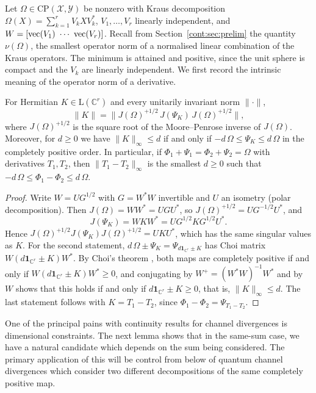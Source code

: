 Let $\Omega\in\mathrm{CP}(\mathcal{X},\mathcal{Y})$ be nonzero with Kraus decomposition $\Omega(X)=\sum_{k=1}^rV_kXV_k^*$, $V_1,\dots,V_r$ linearly independent, and $W=[\vectorise(V_1)\ \cdots\ \vectorise(V_r)]$. Recall from Section~\ref{cont:sec:prelim} the quantity $\nu(\Omega)$,
the smallest operator norm of a normalised linear combination of the Kraus operators. The minimum is attained and positive, since the unit sphere is compact and the $V_k$ are linearly independent. We first record the intrinsic meaning of the operator norm of a derivative.

\begin{lemma}\label{cont:lem:relative distance}
For Hermitian $K\in\mathrm{L}(\mathbb{C}^r)$ and every unitarily invariant norm $\|\cdot\|$,
\[
\|K\|=\big\|J(\Omega)^{+1/2}\,J(\Psi_K)\,J(\Omega)^{+1/2}\big\|,
\]
where $J(\Omega)^{+1/2}$ is the square root of the Moore--Penrose inverse of $J(\Omega)$. Moreover, for $d\geq0$ we have $\|K\|_\infty\leq d$ if and only if $-d\,\Omega\leq\Psi_K\leq d\,\Omega$ in the completely positive order. In particular, if $\Phi_1+\Psi_1=\Phi_2+\Psi_2=\Omega$ with derivatives $T_1,T_2$, then $\|T_1-T_2\|_\infty$ is the smallest $d\geq0$ such that $-d\,\Omega\leq\Phi_1-\Phi_2\leq d\,\Omega$.
\end{lemma}

\begin{proof}
Write $W=UG^{1/2}$ with $G=W^*W$ invertible and $U$ an isometry (polar decomposition). Then $J(\Omega)=WW^*=UGU^*$, so $J(\Omega)^{+1/2}=UG^{-1/2}U^*$, and
\[
J(\Psi_K)=WKW^*=UG^{1/2}KG^{1/2}U^*.
\]
Hence $J(\Omega)^{+1/2}J(\Psi_K)J(\Omega)^{+1/2}=UKU^*$, which has the same singular values as $K$. For the second statement, $d\,\Omega\pm\Psi_K=\Psi_{d\mathbf{1}_{\mathbb{C}^r}\pm K}$ has Choi matrix $W(d\mathbf{1}_{\mathbb{C}^r}\pm K)W^*$. By Choi's theorem \cite{Choi1975}, both maps are completely positive if and only if $W(d\mathbf{1}_{\mathbb{C}^r}\pm K)W^*\geq0$, and conjugating by $W^+=(W^*W)^{-1}W^*$ and by $W$ shows that this holds if and only if $d\mathbf{1}_{\mathbb{C}^r}\pm K\geq0$, that is, $\|K\|_\infty\leq d$. The last statement follows with $K=T_1-T_2$, since $\Phi_1-\Phi_2=\Psi_{T_1-T_2}$.
\end{proof}
One of the principal pains with continuity results for channel divergences is dimensional constraints. The next lemma shows that in the same-sum case, we have a natural candidate which depends on the sum being considered. The primary application of this will be control from below of quantum channel divergences which consider two different decompositions of the same completely positive map.

